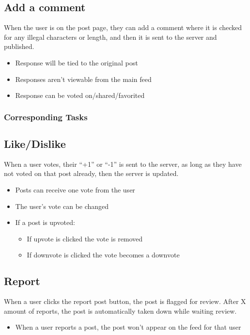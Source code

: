 \documentclass[12pt]{article}
\begin{document}
\subsection{Add a comment}
When the user is on the post page, they can add a comment where it is checked
for any illegal characters or length, and then it is sent to the server and
published.
\begin{itemize}
  \item Response will be tied to the original post
  \item Responses aren’t viewable from the main feed
  \item Response can be voted on/shared/favorited
\end{itemize}
\subsubsection{Corresponding Tasks}

\subsection{Like/Dislike}
When a user votes, their “+1” or “-1” is sent to the server, as long as they
have not voted on that post already, then the server is updated.
\begin{itemize}
  \item Posts can receive one vote from the user
  \item The user’s vote can be changed
  \item If a post is upvoted:
  \begin{itemize}
    \item If upvote is clicked the vote is removed
    \item If downvote is clicked the vote becomes a downvote
  \end{itemize}
\end{itemize}

\subsection{Report}
When a user clicks the report post button, the post is flagged for review. After
X amount of reports, the post is automatically taken down while waiting review.
\begin{itemize}
  \item When a user reports a post, the post won’t appear on the feed for that user
\end{itemize}
\end{document}
